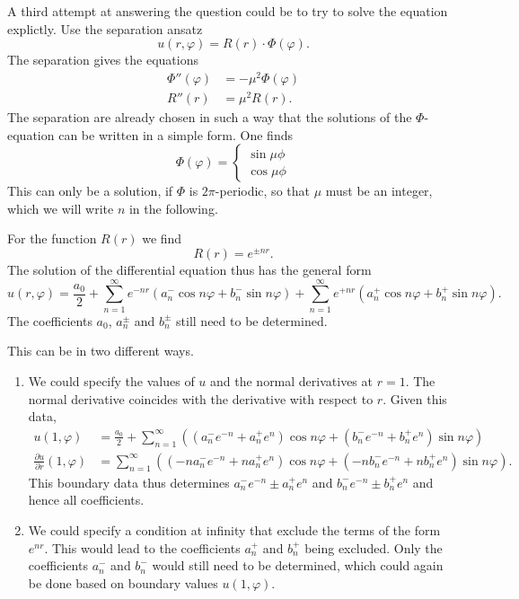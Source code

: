 \begin{loesung}
A third attempt at answering the question could be to try to solve
the equation explictly.
Use the separation ansatz
\[
u(r,\varphi) = R(r) \cdot \Phi(\varphi).
\]
The separation gives the equations
\begin{align*}
\Phi''(\varphi)&=-\mu^2\Phi(\varphi)
\\
R''(r)&=\mu^2R(r).
\end{align*}
The separation are already chosen in such a way that the solutions
of the $\Phi$-equation can be written in a simple form.
One finds
\[
\Phi(\varphi) =
\begin{cases}
\sin\mu\phi\\
\cos\mu\phi
\end{cases}
\]
This can only be a solution, if $\Phi$ is $2\pi$-periodic, so that
$\mu$ must be an integer, which we will write $n$ in the following.

For the function $R(r)$ we find
\[
R(r) = e^{\pm nr}.
\]
The solution of the differential equation thus has the general form
\[
u(r,\varphi)
=
\frac{a_0}2
+
\sum_{n=1}^\infty
e^{-nr}(a_n^- \cos n\varphi + b_n^- \sin n\varphi)
+
\sum_{n=1}^\infty
e^{+nr}(a_n^+ \cos n\varphi + b_n^+ \sin n\varphi).
\]
The coefficients 
$a_0$, $a_n^\pm$ and $b_n^\pm$ still need to be determined.

This can be in two different ways.

\begin{enumerate}
\item
We could specify the values of $u$ and the normal derivatives at $r=1$.
The normal derivative coincides with the derivative with respect to $r$.
Given this data,
\begin{align*}
u(1,\varphi)
&=
\frac{a_0}2
+
\sum_{n=1}^\infty ((a_n^-e^{-n}+a_n^+e^n)\cos n\varphi + (b_n^-e^{-n}+b_n^+e^n)\sin n\varphi)
\\
\frac{\partial u}{\partial r}(1,\varphi)
&=
\sum_{n=1}^\infty ((-na_n^-e^{-n}+na_n^+e^n)\cos n\varphi + (-nb_n^-e^{-n}+nb_n^+e^n)\sin n\varphi).
\end{align*}
This boundary data thus determines
$a_n^-e^{-n}\pm a_n^+e^n$ and $b_n^-e^{-n}\pm b_n^+e^n$
and hence all coefficients.
\item
We could specify a condition at infinity that exclude the terms of the
form $e^{nr}$.
This would lead to the coefficients $a_n^+$ and $b_n^+$ being
excluded.
Only the coefficients $a_n^-$ and $b_n^-$ would still need to be
determined, which could again be done based on boundary values 
$u(1,\varphi)$.
\qedhere
\end{enumerate}
\end{loesung}

